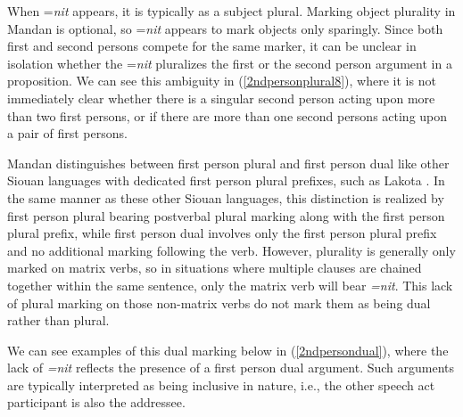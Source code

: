 When =\textit{nit} appears, it is typically as a subject plural. Marking object plurality in Mandan is optional, so =\textit{nit} appears to mark objects only sparingly. Since both first and second persons compete for the same marker, it can be unclear in isolation whether the =\textit{nit} pluralizes the first or the second person argument in a proposition. We can see this ambiguity in (\ref{2ndpersonplural8}), where it is not immediately clear whether there is a singular second person acting upon more than two first persons, or if there are more than one second persons acting upon a pair of first persons.

Mandan distinguishes between first person plural and first person dual  like other Siouan languages with dedicated first person plural prefixes, such as Lakota \citep[761]{ullrich2011}. In the same manner as these other Siouan languages, this distinction is realized by first person plural bearing postverbal plural marking along with the first person plural prefix, while first person dual involves only the first person plural prefix and no additional marking following the verb. However, plurality is generally only marked on matrix verbs, so in situations where multiple clauses are chained together within the same sentence, only the matrix verb will bear \textit{=nit}. This lack of plural marking on those non-matrix verbs do not mark them as being dual rather than plural. 

We can see examples of this dual marking below in (\ref{2ndpersondual}), where the lack of \textit{=nit} reflects the presence of a first person dual argument. Such arguments are typically interpreted as being inclusive in nature, i.e., the other speech act participant is also the addressee.

